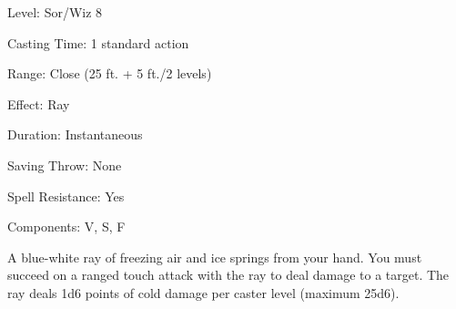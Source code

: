 
\begin{description*}
\item[Level:] Sor/Wiz 8
\item[Casting Time:] 1 standard action
\item[Range:] Close (25 ft. + 5 ft./2 levels)
\item[Effect:] Ray
\item[Duration:] Instantaneous
\item[Saving Throw:] None
\item[Spell Resistance:] Yes
\item[Components:] V, S, F
\end{description*}

A blue-white ray of freezing air and ice springs from your hand. You must succeed
on a ranged touch attack with the ray to deal damage to a target. The ray deals
1d6 points of cold damage per caster level (maximum 25d6).